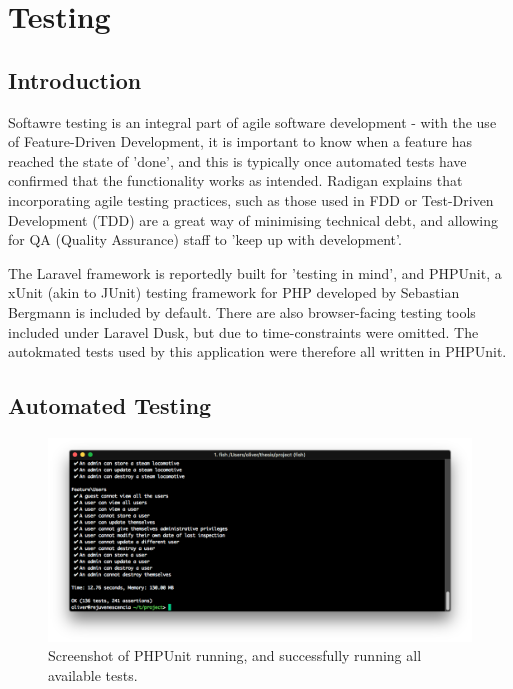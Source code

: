 \chapter{Testing}

\section{Introduction}

Softawre testing is an integral part of agile software development - with the use of Feature-Driven Development, it is important to know when a feature has reached the state of 'done', and this is typically once automated tests have confirmed that the functionality works as intended. \cite{Karam1} Radigan explains that incorporating agile testing practices, such as those used in FDD or Test-Driven Development (TDD) are a great way of minimising technical debt, and allowing for QA (Quality Assurance) staff to 'keep up with development'. \cite{Radigan1}

The Laravel framework is reportedly built for 'testing in mind', and PHPUnit, a xUnit (akin to JUnit) testing framework for PHP developed by Sebastian Bergmann is included by default. There are also browser-facing testing tools included under Laravel Dusk, but due to time-constraints were omitted. The autokmated tests used by this application were therefore all written in PHPUnit. \cite{Laravel10} \cite{Bergmann1}


\section{Automated Testing}

\begin{figure}[!ht]
    \centering
    \includegraphics[width=1.0\textwidth]{Figures/tests}
    \caption{Screenshot of PHPUnit running, and successfully running all available tests.}
    \label{fig:testscmd}
\end{figure}

